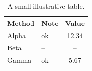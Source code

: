 \begin{table}[htbp]
  \centering
  \caption{A small illustrative table.}
  \begin{tabular}{l l S[table-format=3.2]}
    \toprule
    Method & Note & {Value} \\
    \midrule
    Alpha & ok & 12.34 \\
    Beta  & -- & {--}  \\
    Gamma & ok & 5.67  \\
    \bottomrule
  \end{tabular}
\end{table}
